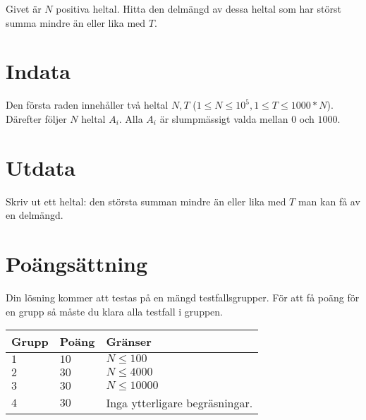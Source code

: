 Givet är $N$ positiva heltal. Hitta den delmängd av dessa heltal som har störst summa mindre än eller lika med $T$. 


\section*{Indata}
Den första raden innehåller två heltal $N, T$ ($1 \leq N \leq 10^5, 1 \leq T \leq 1000*N$).
Därefter följer $N$ heltal $A_i$. Alla $A_i$ är slumpmässigt valda mellan $0$ och $1000$.
\section*{Utdata}
Skriv ut ett heltal: den största summan mindre än eller lika med $T$ man kan få av en delmängd.

\section*{Poängsättning}
Din lösning kommer att testas på en mängd testfallsgrupper.
För att få poäng för en grupp så måste du klara alla testfall i gruppen.

\noindent
\begin{tabular}{| l | l | p{12cm} |}
  \hline
  \textbf{Grupp} & \textbf{Poäng} & \textbf{Gränser} \\ \hline
  $1$    & $10$      & $N \leq 100$ \\ \hline
  $2$    & $30$      & $N \leq 4000$ \\ \hline
  $3$    & $30$      & $N \leq 10000$ \\ \hline 
  $4$    & $30$      & Inga ytterligare begräsningar. \\ \hline
\end{tabular}
